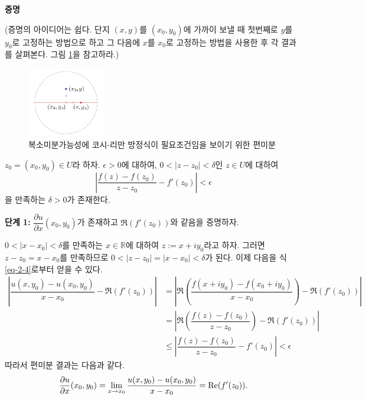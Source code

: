 
{\bf 증명}

(증명의 아이디어는 쉽다. 단지 $(x,y)$를 $(x_0, y_0)$에 가까이 보낼 때
첫번째로 $y$를 $y_0$로 고정하는 방법으로 하고 그 다음에 
$x$를 $x_0$로 고정하는 방법을 사용한 후 각 결과를 살펴본다.
그림 \ref{fig-2-6}을 참고하라.)

\begin{figure}[!h]
\begin{center}
\includegraphics[width=0.3\textwidth]{./SaltChapter/figs/fig-2-6}
\end{center}
\caption{복소미분가능성에  코시-리만 방정식이 필요조건임을 보이기 위한 편미분}
\label{fig-2-6}
\end{figure}

$z_0 = (x_0, y_0)\in U$라 하자.
$\epsilon>0$에 대하여, 
$0<|z-z_0|<\delta$인 $z\in U$에 대하여
\begin{equation}\label{eq-2-4}
\left| \dfrac{f(z)-f(z_0)}{z-z_0} - f'(z_0) \right| < \epsilon
\end{equation}
을 만족하는 $\delta >0$가 존재한다.

{\bf 단계 1:}
$\dfrac{\partial u}{\partial x}(x_0,y_0)$가 존재하고 $\Re(f'(z_0))$와 같음을 증명하자.

$0<|x-x_0|<\delta$를 만족하는 $x\in\mathbb R$에 대하여 $z:=x+iy_0$라고 하자.
그러면 $z-z_0 = x-x_0$를 만족하므로
$0<|z-z_0| = |x-x_0| < \delta$가 된다.
이제 다음을 식 \eqref{eq-2-4}로부터 얻을 수 있다. 
\begin{align*}
\left| \dfrac{u(x,y_0) - u(x_0, y_0)}{x-x_0} - \Re(f'(z_0)) \right| 
&= \left| \Re\left(\dfrac{f(x+iy_0)-f(x_0+iy_0)}{x-x_0}\right) - \Re(f'(z_0)) \right| \\
&= \left| \Re\left(\dfrac{f(z)-f(z_0)}{z-z_0}\right) - \Re(f'(z_0)) \right| \\
&\le \left| \dfrac{f(z)-f(z_0)}{z-z_0} - f'(z_0) \right| < \epsilon 
\end{align*}
따라서 편미분 결과는 다음과 같다.
\[
\dfrac{\partial u}{\partial x}(x_0, y_0) 
= \lim_{x\to x_0} \dfrac{u(x,y_0) - u(x_0, y_0)}{x-x_0} \\
= \Re(f'(z_0)).
\]


